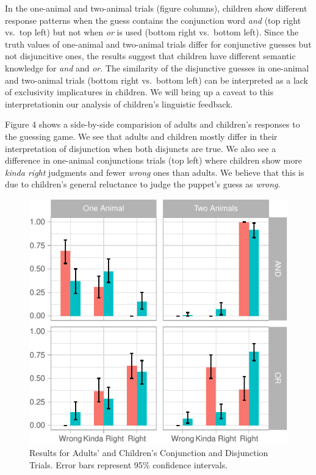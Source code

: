\documentclass[10pt, letterpaper]{article}
\newenvironment{CodeChunk}{}{}
\begin{document}
In the one-animal and two-animal trials (figure columns), children show
different response patterns when the guess contains the conjunction word
\emph{and} (top right vs.~top left) but not when \emph{or} is used
(bottom right vs.~bottom left). Since the truth values of one-animal and
two-animal trials differ for conjunctive guesses but not disjuncitive
ones, the results suggest that children have different semantic
knowledge for \emph{and} and \emph{or}. The similarity of the
disjunctive guesses in one-animal and two-animal trials (bottom right
vs.~bottom left) can be interpreted as a lack of exclusivity
implicatures in children. We will bring up a caveat to this
interpretationin our analysis of children's linguistic feedback.

Figure 4 shows a side-by-side comparision of adults and children's
responses to the guessing game. We see that adults and children mostly
differ in their interpretation of disjunction when both disjuncts are
true. We also see a difference in one-animal conjunctions trials (top
left) where children show more \emph{kinda right} judgments and fewer
\emph{wrong} ones than adults. We believe that this is due to children's
general reluctance to judge the puppet's guess as \emph{wrong}.

\begin{CodeChunk}
\begin{figure}[h]

{\centering \includegraphics{figs/child_adult_data-1} 

}

\caption[Results for Adults' and Children's Conjunction and Disjunction Trials]{Results for Adults' and Children's Conjunction and Disjunction Trials. Error bars represent 95\% confidence intervals.}\label{fig:child_adult_data}
\end{figure}
\end{CodeChunk}
\end{document}
